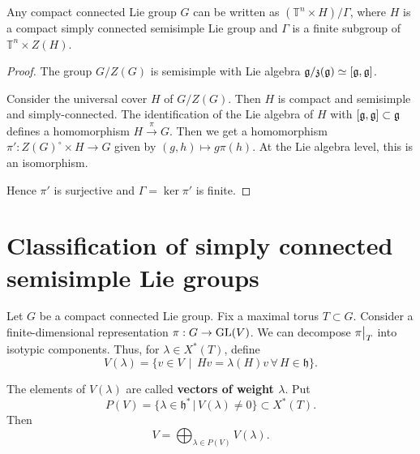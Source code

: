 \documentclass[11pt, english]{article}
\begin{document}
\begin{prop}
 Any compact connected Lie group $G$ can be written as $(\mathbb T^n \times H) / \Gamma$, where $H$ is a compact simply connected semisimple Lie group and $\Gamma$ is a finite subgroup of $\mathbb T^n \times Z(H)$.
\end{prop}

\begin{proof}
The group $G/Z(G)$ is semisimple with Lie algebra $\mathfrak g/\mathfrak z(\mathfrak g) \simeq [\mathfrak g, \mathfrak g]$. 

Consider the universal cover $H$ of $G/Z(G)$. Then $H$ is compact and semisimple and simply-connected. The identification of the Lie algebra of $H$ with $[\mathfrak g,\mathfrak g] \subset \mathfrak g$ defines a homomorphism $H \xrightarrow{\pi} G$. Then we get a homomorphism $\pi':Z(G)^\circ \times H \to G$ given by $(g,h) \mapsto g \pi(h)$. At the Lie algebra level, this is an isomorphism. 

Hence $\pi'$ is surjective and $\Gamma = \ker \pi'$ is finite.
\end{proof}


\newpage
\section{Classification of simply connected semisimple Lie groups}

Let $G$ be a compact connected Lie group. Fix a maximal torus $T \subset G$. Consider a finite-dimensional representation $\pi:G \to \operatorname{GL}(V)$. We can decompose $\restr{\pi}T$ into isotypic components. Thus, for $\lambda \in X^\ast(T)$, define
$$
V(\lambda) = \{ v \in V \, \mid \, Hv =\lambda(H)v \, \forall \, H \in \mathfrak h \}.
$$

The elements of $V(\lambda)$ are called \textbf{vectors of weight $\lambda$}. Put
$$
P(V) = \{ \lambda \in \mathfrak h^\ast \, | \, V(\lambda) \neq 0 \} \subset X^\ast(T).
$$
Then
$$
V = \bigoplus_{\lambda \in P(V)} V(\lambda).
$$
\end{document}
